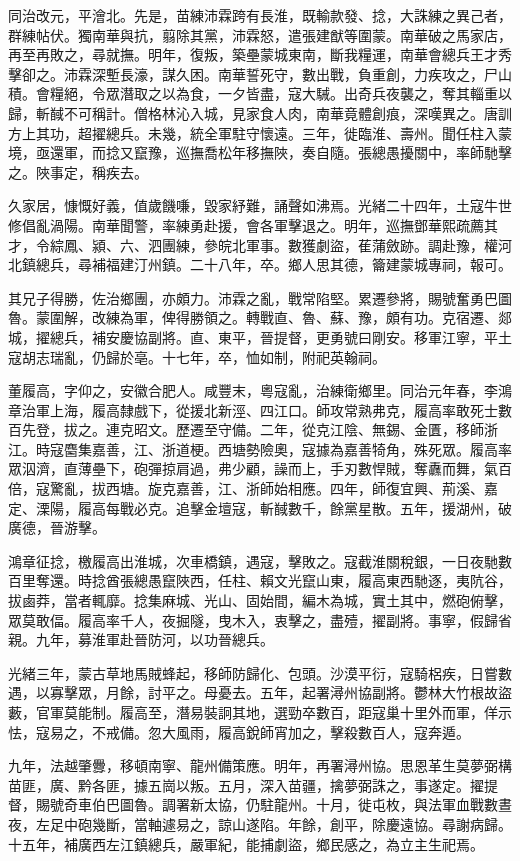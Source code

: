 \begin{pinyinscope}
同治改元，平澮北。先是，苗練沛霖跨有長淮，既輸款發、捻，大誅練之異己者，群練帖伏。獨南華與抗，翦除其黨，沛霖怒，遣張建猷等圍蒙。南華破之馬家店，再至再敗之，尋就撫。明年，復叛，築壘蒙城東南，斷我糧運，南華會總兵王才秀擊卻之。沛霖深塹長濠，謀久困。南華誓死守，數出戰，負重創，力疾攻之，尸山積。會糧絕，令眾潛取之以為食，一夕皆盡，寇大駴。出奇兵夜襲之，奪其輜重以歸，斬馘不可稱計。僧格林沁入城，見家食人肉，南華竟體創痕，深嘆異之。唐訓方上其功，超擢總兵。未幾，統全軍駐守懷遠。三年，徙臨淮、壽州。聞任柱入蒙境，亟還軍，而捻又竄豫，巡撫喬松年移撫陜，奏自隨。張總愚擾關中，率師馳擊之。陜事定，稱疾去。

久家居，慷慨好義，值歲饑嗛，毀家紓難，誦聲如沸焉。光緒二十四年，土寇牛世修倡亂渦陽。南華聞警，率練勇赴援，會各軍擊退之。明年，巡撫鄧華熙疏薦其才，令綜鳳、潁、六、泗團練，參皖北軍事。數獲劇盜，萑蒲斂跡。調赴豫，權河北鎮總兵，尋補福建汀州鎮。二十八年，卒。鄉人思其德，籥建蒙城專祠，報可。

其兄子得勝，佐治鄉團，亦頗力。沛霖之亂，戰常陷堅。累遷參將，賜號奮勇巴圖魯。蒙圍解，改練為軍，俾得勝領之。轉戰直、魯、蘇、豫，頗有功。克宿遷、郯城，擢總兵，補安慶協副將。直、東平，晉提督，更勇號曰剛安。移軍江寧，平土寇胡志瑞亂，仍歸於亳。十七年，卒，恤如制，附祀英翰祠。

董履高，字仰之，安徽合肥人。咸豐末，粵寇亂，治練衛鄉里。同治元年春，李鴻章治軍上海，履高隸戲下，從援北新涇、四江口。師攻常熟弗克，履高率敢死士數百先登，拔之。連克昭文。歷遷至守備。二年，從克江陰、無錫、金匱，移師浙江。時寇麕集嘉善，江、浙道梗。西塘勢險奧，寇據為嘉善犄角，殊死眾。履高率眾泅濟，直薄壘下，砲彈掠肩過，弗少顧，譟而上，手刃數悍賊，奪纛而舞，氣百倍，寇驚亂，拔西塘。旋克嘉善，江、浙師始相應。四年，師復宜興、荊溪、嘉定、溧陽，履高每戰必克。追擊金壇寇，斬馘數千，餘黨星散。五年，援湖州，破廣德，晉游擊。

鴻章征捻，檄履高出淮城，次車橋鎮，遇寇，擊敗之。寇截淮關稅銀，一日夜馳數百里奪還。時捻酋張總愚竄陜西，任柱、賴文光竄山東，履高東西馳逐，夷阬谷，拔鹵莽，當者輒靡。捻集麻城、光山、固始間，編木為城，實土其中，燃砲俯擊，眾莫敢偪。履高率千人，夜掘隧，曳木入，衷擊之，盡殪，擢副將。事寧，假歸省親。九年，募淮軍赴晉防河，以功晉總兵。

光緒三年，蒙古草地馬賊蜂起，移師防歸化、包頭。沙漠平衍，寇騎梠疾，日嘗數遇，以寡擊眾，月餘，討平之。母憂去。五年，起署潯州協副將。鬱林大竹根故盜藪，官軍莫能制。履高至，潛易裝詗其地，選勁卒數百，距寇巢十里外而軍，佯示怯，寇易之，不戒備。忽大風雨，履高銳師宵加之，擊殺數百人，寇奔遁。

九年，法越肇釁，移頓南寧、龍州備策應。明年，再署潯州協。思恩革生莫夢弼構苗匪，廣、黔各匪，據五崗以叛。五月，深入苗疆，擒夢弼誅之，事遂定。擢提督，賜號奇車伯巴圖魯。調署新太協，仍駐龍州。十月，徙屯枚，與法軍血戰數晝夜，左足中砲幾斷，當軸遽易之，諒山遂陷。年餘，創平，除慶遠協。尋謝病歸。十五年，補廣西左江鎮總兵，嚴軍紀，能捕劇盜，鄉民感之，為立主生祀焉。


\end{pinyinscope}
